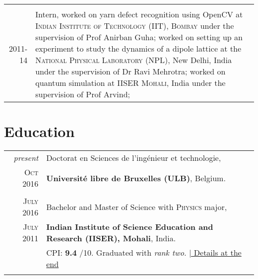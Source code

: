 \documentclass[a4paper,10pt]{article}
\begin{document}
\begin{tabular}{r|p{11cm}}
\multicolumn{2}{c}{} \\

\textsc{2011-14}  & Intern, {\footnotesize worked on yarn defect recognition using OpenCV at} \textsc{Indian Institute of Technology (IIT), Bombay} 
                      {\footnotesize under the supervision of} \small{Prof Anirban Guha}; 
                      {\footnotesize worked on setting up an experiment to study the dynamics of a dipole lattice at the}
                      \textsc{National Physical Laboratory (NPL)}, New Delhi, India
                      {\footnotesize under the supervision of} \small{Dr Ravi Mehrotra};
                      {\footnotesize worked on quantum simulation at} \textsc{IISER Mohali}, India 
                      {\footnotesize under the supervision of} \small{Prof Arvind}; 
\end{tabular}

\section{Education}
\begin{tabular}{rp{11cm}}	
  \emph{present} & Doctorat en Sciences de l'ingénieur et technologie,\\
 \textsc{Oct} 2016  & \textbf{Université libre de Bruxelles (ULB)}, Belgium.\\
                    & \\
 \textsc{July} 2016 & Bachelor and Master of Science with \textsc{Physics} major,\\
 \textsc{July} 2011 & \textbf{Indian Institute of Science Education and Research (IISER), Mohali}, India.\\
& CPI: \textbf{9.4} /10. \small Graduated with \emph{rank two.} \hyperlink{grades}{\hfill | \footnotesize Details at the end}\\&\\ 
\end{tabular}

\end{document}
